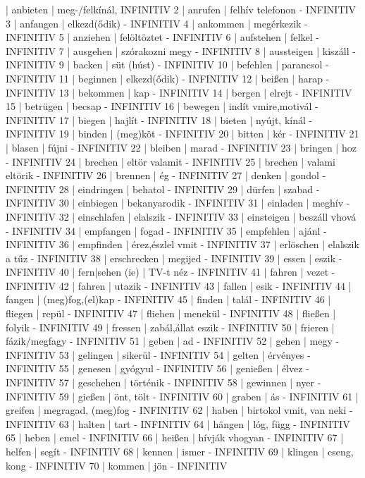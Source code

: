 \documentclass{article}
\newenvironment{exmp}{\verbatim}{\endverbatim}
\begin{document}
\begin{exmp}
1 | anbieten | meg-/felkínál, INFINITIV
2 | anrufen | felhív telefonon - INFINITIV
3 | anfangen | elkezd(ődik) - INFINITIV
4 | ankommen | megérkezik - INFINITIV
5 | anziehen | felöltöztet - INFINITIV
6 | aufstehen | felkel - INFINITIV
7 | ausgehen | szórakozni megy - INFINITIV
8 | aussteigen | kiszáll - INFINITIV
9 | backen | süt (húst) - INFINITIV
10 | befehlen | parancsol - INFINITIV
11 | beginnen | elkezd(ődik) - INFINITIV
12 | beißen | harap - INFINITIV
13 | bekommen | kap - INFINITIV
14 | bergen | elrejt - INFINITIV
15 | betrügen | becsap - INFINITIV
16 | bewegen | indít vmire,motivál - INFINITIV
17 | biegen | hajlít - INFINITIV
18 | bieten | nyújt, kínál - INFINITIV
19 | binden | (meg)köt - INFINITIV
20 | bitten | kér - INFINITIV
21 | blasen | fújni - INFINITIV
22 | bleiben | marad - INFINITIV
23 | bringen | hoz - INFINITIV
24 | brechen | eltör valamit - INFINITIV
25 | brechen | valami eltörik - INFINITIV
26 | brennen | ég - INFINITIV
27 | denken | gondol - INFINITIV
28 | eindringen | behatol - INFINITIV
29 | dürfen | szabad - INFINITIV
30 | einbiegen | bekanyarodik - INFINITIV
31 | einladen | meghív - INFINITIV
32 | einschlafen | elalszik - INFINITIV
33 | einsteigen | beszáll vhová - INFINITIV
34 | empfangen | fogad - INFINITIV
35 | empfehlen | ajánl - INFINITIV
36 | empfinden | érez,észlel vmit - INFINITIV
37 | erlöschen | elalszik a tűz - INFINITIV
38 | erschrecken | megijed - INFINITIV
39 | essen | eszik - INFINITIV
40 | fern|sehen (ie) | TV-t néz - INFINITIV
41 | fahren | vezet - INFINITIV
42 | fahren | utazik - INFINITIV
43 | fallen | esik - INFINITIV
44 | fangen | (meg)fog,(el)kap - INFINITIV
45 | finden | talál - INFINITIV
46 | fliegen | repül - INFINITIV
47 | fliehen | menekül - INFINITIV
48 | fließen | folyik - INFINITIV
49 | fressen | zabál,állat eszik - INFINITIV
50 | frieren | fázik/megfagy - INFINITIV
51 | geben | ad - INFINITIV
52 | gehen | megy - INFINITIV
53 | gelingen | sikerül - INFINITIV
54 | gelten | érvényes - INFINITIV
55 | genesen | gyógyul - INFINITIV
56 | genießen | élvez - INFINITIV
57 | geschehen | történik - INFINITIV
58 | gewinnen | nyer - INFINITIV
59 | gießen | önt, tölt - INFINITIV
60 | graben | ás - INFINITIV
61 | greifen | megragad, (meg)fog - INFINITIV
62 | haben | birtokol vmit, van neki - INFINITIV
63 | halten | tart - INFINITIV
64 | hängen | lóg, függ - INFINITIV
65 | heben | emel - INFINITIV
66 | heißen | hívják vhogyan - INFINITIV
67 | helfen | segít - INFINITIV
68 | kennen | ismer - INFINITIV
69 | klingen | cseng, kong - INFINITIV
70 | kommen | jön - INFINITIV

\end{exmp}
\end{document}
